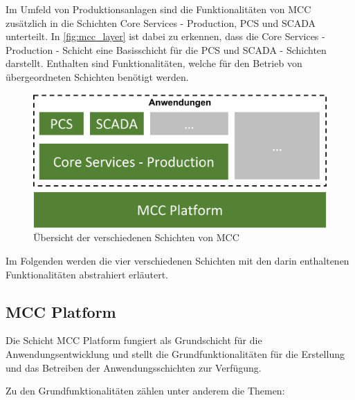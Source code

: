 Im Umfeld von Produktionsanlagen sind die Funktionalitäten von MCC zusätzlich in die Schichten \glqq Core Services - Production\grqq{}, \glqq PCS\grqq{} und \glqq SCADA\grqq{} unterteilt. In \autoref{fig:mcc_layer} ist dabei zu erkennen, dass die \glqq Core Services - Production\grqq{} - Schicht eine Basisschicht für die \glqq PCS\grqq{} und \glqq SCADA\grqq{} - Schichten darstellt. Enthalten sind Funktionalitäten, welche für den Betrieb von übergeordneten Schichten benötigt werden.

\begin{figure}[H]
    \centering
    \includegraphics[width=0.7\linewidth]{images/MCC_Layer.png}
    \caption{Übersicht der verschiedenen Schichten von MCC}
    \label{fig:mcc_layer}
\end{figure}

Im Folgenden werden die vier verschiedenen Schichten mit den darin enthaltenen Funktionalitäten abstrahiert erläutert.

\subsection{MCC Platform\label{subsec3.1.1:Unterunterpunkt-1}}

Die Schicht \glqq MCC Platform\grqq{} fungiert als Grundschicht für die Anwendungsentwicklung und stellt die Grundfunktionalitäten für die Erstellung und das Betreiben der Anwendungsschichten zur Verfügung.

Zu den Grundfunktionalitäten zählen unter anderem die Themen:

